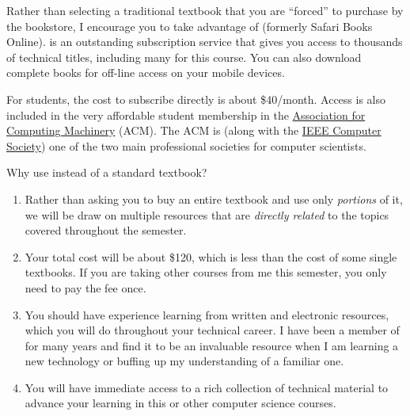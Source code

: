 Rather than selecting a traditional textbook
that you are ``forced'' to purchase by the bookstore,
I encourage you to take advantage of
\href{https://www.oreilly.com/online-learning/}{\safari}
(formerly Safari Books Online).
\safari{}
is an outstanding subscription service that gives you access
to thousands of technical titles,
including many for this course.
You can also download complete books for off-line
access on your mobile devices.

For students, the cost to subscribe directly is about \$40/month.
Access is also included in the very affordable student membership in the
\href{https://www.acm.org/}{Association for Computing Machinery} (ACM).
The ACM is
(along with the \href{https://www.computer.org/}{IEEE Computer Society})
one of the two main professional societies for computer scientists.

Why use \safari{} instead of a standard textbook?
\begin{enumerate}
\item
  Rather than asking you to buy an entire textbook
  and use only \emph{portions} of it,
  we will be draw on multiple resources
  that are \emph{directly related} to the topics 
  covered throughout the semester.
\item
  Your total cost will be about \$120,
  which is less than the cost of some single textbooks.
  If you are taking other courses from me this semester,
  you only need to pay the fee once.
\item
  You should have experience learning from written
  and electronic resources, which you will do
  throughout your technical career.
  I have been a member of \safari{} for many years
  and find it to be an invaluable resource
  when I am learning a new technology
  or buffing up my understanding of a familiar one.
\item
  You will have immediate access to a rich collection
  of technical material to advance your learning in this
  or other computer science courses.
\end{enumerate}


